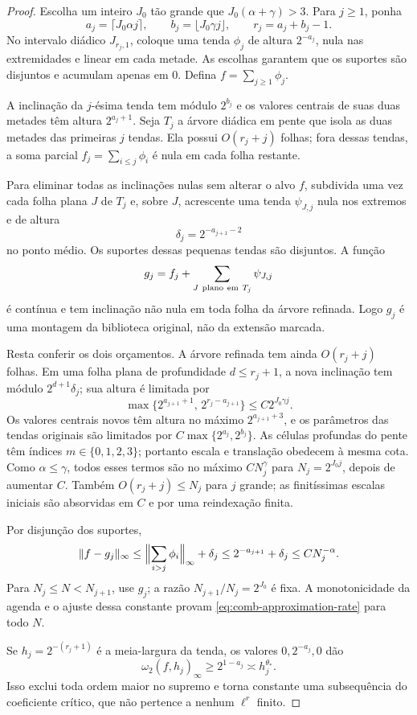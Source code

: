 \documentclass[11pt,a4paper]{article}
\theoremstyle{definition}
\theoremstyle{remark}
\begin{document}
\begin{proof}
Escolha um inteiro $J_0$ tão grande que
$J_0(\alpha+\gamma)>3$. Para $j\ge1$, ponha
\[
 a_j=\lceil J_0\alpha j\rceil,
 \qquad b_j=\lfloor J_0\gamma j\rfloor,
 \qquad r_j=a_j+b_j-1.
\]
No intervalo diádico $J_{r_j,1}$, coloque uma tenda $\phi_j$ de altura
$2^{-a_j}$, nula nas extremidades e linear em cada metade. As escolhas
garantem que os suportes são disjuntos e acumulam apenas em $0$. Defina
$f=\sum_{j\ge1}\phi_j$.

A inclinação da $j$-ésima tenda tem módulo $2^{b_j}$ e os valores centrais de
suas duas metades têm altura $2^{a_j+1}$. Seja $T_j$ a árvore diádica em pente
que isola as duas metades das primeiras $j$ tendas. Ela possui
$O(r_j+j)$ folhas; fora dessas tendas, a soma parcial
$f_j=\sum_{i\le j}\phi_i$ é nula em cada folha restante.

Para eliminar todas as inclinações nulas sem alterar o alvo $f$, subdivida uma
vez cada folha plana $J$ de $T_j$ e, sobre $J$, acrescente uma tenda
$\psi_{J,j}$ nula nos extremos e de altura
\[
 \delta_j=2^{-a_{j+1}-2}
\]
no ponto médio. Os suportes dessas pequenas tendas são disjuntos. A função
\[
 g_j=f_j+\sum_{J\ {\rm plano\ em}\ T_j}\psi_{J,j}
\]
é contínua e tem inclinação não nula em toda folha da árvore refinada. Logo
$g_j$ é uma montagem da biblioteca original, não da extensão marcada.

Resta conferir os dois orçamentos. A árvore refinada tem ainda
$O(r_j+j)$ folhas. Em uma folha plana de profundidade $d\le r_j+1$, a nova
inclinação tem módulo $2^{d+1}\delta_j$; sua altura é limitada por
\[
 \max\{2^{a_{j+1}+1},\,2^{r_j-a_{j+1}}\}
 \le C2^{J_0\gamma j}.
\]
Os valores centrais novos têm altura no máximo $2^{a_{j+1}+3}$, e os
parâmetros das tendas originais são limitados por
$C\max\{2^{a_j},2^{b_j}\}$. As células profundas do pente têm índices
$m\in\{0,1,2,3\}$; portanto escala e translação obedecem à mesma cota.
Como $\alpha\le\gamma$, todos esses termos são no máximo
$CN_j^\gamma$ para $N_j=2^{J_0j}$, depois de aumentar $C$. Também
$O(r_j+j)\le N_j$ para $j$ grande; as finitíssimas escalas iniciais são
absorvidas em $C$ e por uma reindexação finita.

Por disjunção dos suportes,
\[
 \|f-g_j\|_\infty
 \le \Bigl\|\sum_{i>j}\phi_i\Bigr\|_\infty+\delta_j
 \le 2^{-a_{j+1}}+\delta_j
 \le C N_j^{-\alpha}.
\]
Para $N_j\le N<N_{j+1}$, use $g_j$; a razão
$N_{j+1}/N_j=2^{J_0}$ é fixa. A monotonicidade da agenda e o ajuste dessa
constante provam \eqref{eq:comb-approximation-rate} para todo $N$.

Se $h_j=2^{-(r_j+1)}$ é a meia-largura da tenda, os valores
$0,2^{-a_j},0$ dão
\[
 \omega_2(f,h_j)_\infty\ge2^{1-a_j}\asymp h_j^{\theta_*}.
\]
Isso exclui toda ordem maior no supremo e torna constante uma subsequência do
coeficiente crítico, que não pertence a nenhum $\ell^r$ finito.
\end{proof}
\end{document}
